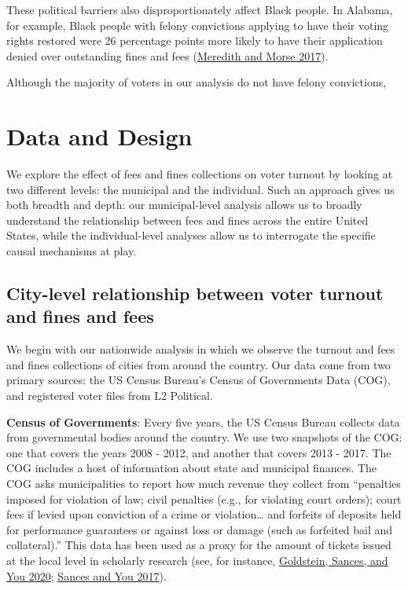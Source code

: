 \documentclass[
  12pt,
]{article}
\begin{document}
These political barriers also disproportionately affect Black people. In Alabama, for example, Black people with felony convictions applying to have their voting rights restored were 26 percentage points more likely to have their application denied over outstanding fines and fees (\protect\hyperlink{ref-Meredith2017}{Meredith and Morse 2017}).

Although the majority of voters in our analysis do not have felony convictions,

\hypertarget{data-and-design}{%
\section*{Data and Design}\label{data-and-design}}

We explore the effect of fees and fines collections on voter turnout by looking at two different levels: the municipal and the individual. Such an approach gives us both breadth and depth: our municipal-level analysis allows us to broadly understand the relationship between fees and fines across the entire United States, while the individual-level analyses allow us to interrogate the specific causal mechanisms at play.

\hypertarget{city-level-relationship-between-voter-turnout-and-fines-and-fees}{%
\subsection*{City-level relationship between voter turnout and fines and fees}\label{city-level-relationship-between-voter-turnout-and-fines-and-fees}}

We begin with our nationwide analysis in which we observe the turnout and fees and fines collections of cities from around the country. Our data come from two primary sources: the US Census Bureau's Census of Governments Data (COG), and registered voter files from L2 Political.

\textbf{Census of Governments}: Every five years, the US Census Bureau collects data from governmental bodies around the country. We use two snapshots of the COG: one that covers the years 2008 - 2012, and another that covers 2013 - 2017. The COG includes a host of information about state and municipal finances. The COG asks municipalities to report how much revenue they collect from ``penalties imposed for violation of law; civil penalties (e.g., for violating court orders); court fees if levied upon conviction of a crime or violation\ldots{} and forfeits of deposits held for performance guarantees or against loss or damage (such as forfeited bail and collateral).'' This data has been used as a proxy for the amount of tickets issued at the local level in scholarly research (see, for instance, \protect\hyperlink{ref-Goldstein2020}{Goldstein, Sances, and You 2020}; \protect\hyperlink{ref-Sances2017}{Sances and You 2017}).
\end{document}
